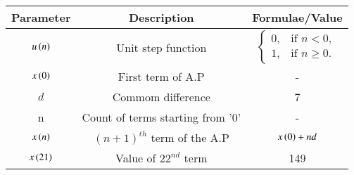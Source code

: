 \renewcommand{\arraystretch}{2}
\begin{tabular}{|c|c|c|}
\hline 
\setlength{\tabcolsep}{1pt}
\textbf{Parameter}  &\textbf{Description} &\textbf{Formulae/Value} \\
\hline
$u\left(n\right)$ & Unit step function & $\begin{cases}
0, & \text{if } n < 0, \\
1, & \text{if } n \geq 0.
\end{cases}$\\
\hline
$x\left(0\right)$ & First term of A.P & - \\
\hline
\textbf{$d$} & Commom difference & 7 \\
\hline
n & Count of terms starting from '0' & - \\
\hline
$x\left(n\right)$ & $(n+1)^{th}$ term of the A.P & $x\left(0\right) + nd$ \\
\hline
$x\left(21\right)$ & Value of $22^{nd}$ term & 149 \\

\hline

\end{tabular}

